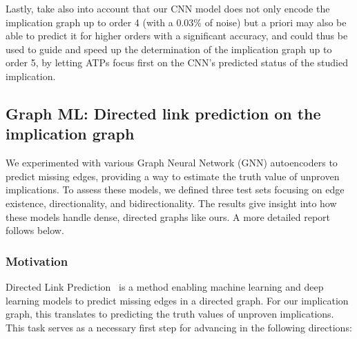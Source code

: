\smallskip

Lastly, take also into account that our CNN model does not only encode the implication graph up to order 4 (with a 0.03\% of noise) but a priori may also be able to predict it for higher orders with a significant accuracy, and could thus be used to guide and speed up the determination of the implication graph up to order 5, by letting ATPs focus first on the CNN’s predicted status of the studied implication.


\subsection{Graph ML: Directed link prediction on the implication graph}
\label{sec:dlp}

We experimented with various Graph Neural Network (GNN) autoencoders to predict missing edges,
providing a way to estimate the truth value of unproven implications. To assess these models,
we defined three test sets focusing on edge existence, directionality, and bidirectionality.
The results give insight into how these models handle dense, directed graphs like ours.
A more detailed report follows below.


\subsubsection{Motivation}

Directed Link Prediction~\cite{Kipf2016} is a method enabling machine learning and deep learning
models to predict missing edges in a directed graph. For our implication graph, this translates to
predicting the truth values of unproven implications. This task serves as a necessary first step
for advancing in the following directions:

